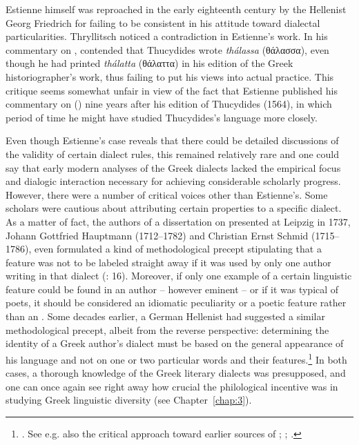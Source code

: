 Estienne himself was reproached in the early eighteenth century by the Hellenist Georg Friedrich \citet[d.3\textsuperscript{v}]{Thryllitsch1709} for failing to be consistent in his attitude toward dialectal particularities. Thryllitsch noticed a contradiction in Estienne’s work. In his commentary on , \citet[13]{Estienne1573} contended that Thucydides wrote \textit{thálassa} (θάλασσα), even though he had printed \textit{thálatta} (θάλαττα) in his edition of the Greek historiographer’s work, thus failing to put his views into actual practice. This critique seems somewhat unfair in view of the fact that Estienne published his commentary on  (\citeyear{Estienne1573}) nine years after his edition of Thucydides (1564), in which period of time he might have studied Thucydides’s language more closely.

Even though Estienne’s case reveals that there could be detailed discussions of the validity of certain dialect rules, this remained relatively rare and one could say that early modern analyses of the Greek dialects lacked the empirical focus and dialogic interaction necessary for achieving considerable scholarly progress. However, there were a number of critical voices other than Estienne’s. Some scholars were cautious about attributing certain properties to a specific dialect. As a matter of fact, the authors of a dissertation on  presented at Leipzig in 1737, Johann Gottfried Hauptmann (1712–1782) and Christian Ernst Schmid (1715–1786), even formulated a kind of methodological precept stipulating that a feature was not to be labeled  straight away if it was used by only one author writing in that dialect (\citealt{Hauptmann1737}: 16). Moreover, if only one example of a certain linguistic feature could be found in an author – however eminent – or if it was typical of poets, it should be considered an idiomatic peculiarity or a poetic feature rather than an . Some decades earlier, a German Hellenist had suggested a similar methodological precept, albeit from the reverse perspective: determining the identity of a Greek author’s dialect must be based on the general appearance of his language and not on one or two particular words and their features.\footnote{\citet[495--496]{Ursin1691}. See e.g. also the critical approach toward earlier sources of \citet{Walper1589}; \citet[{\scriptsize{)(}}.3\textsc{\textsuperscript{r}})]{Portus1603}; \citet[10-12]{Gedike1782}.} In both cases, a thorough knowledge of the Greek literary dialects was presupposed, and one can once again see right away how crucial the philological incentive was in studying Greek linguistic diversity (see Chapter~\ref{chap:3}).

